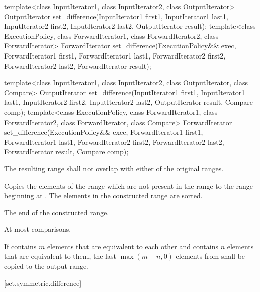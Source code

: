 %
\begin{itemdecl}
template<class InputIterator1, class InputIterator2,
         class OutputIterator>
  OutputIterator
    set_difference(InputIterator1 first1, InputIterator1 last1,
                   InputIterator2 first2, InputIterator2 last2,
                   OutputIterator result);
template<class ExecutionPolicy, class ForwardIterator1, class ForwardIterator2,
           class ForwardIterator>
  ForwardIterator
    set_difference(ExecutionPolicy&& exec,
                   ForwardIterator1 first1, ForwardIterator1 last1,
                   ForwardIterator2 first2, ForwardIterator2 last2,
                   ForwardIterator result);

template<class InputIterator1, class InputIterator2,
         class OutputIterator, class Compare>
  OutputIterator
    set_difference(InputIterator1 first1, InputIterator1 last1,
                   InputIterator2 first2, InputIterator2 last2,
                   OutputIterator result, Compare comp);
template<class ExecutionPolicy, class ForwardIterator1, class ForwardIterator2,
         class ForwardIterator, class Compare>
  ForwardIterator
    set_difference(ExecutionPolicy&& exec,
                   ForwardIterator1 first1, ForwardIterator1 last1,
                   ForwardIterator2 first2, ForwardIterator2 last2,
                   ForwardIterator result, Compare comp);
\end{itemdecl}

\begin{itemdescr}
\pnum
\requires
The resulting range shall not overlap with either of the original ranges.

\pnum
\effects
Copies the elements of the range
which are not present in the range
to the range beginning at
.
The elements in the constructed range are sorted.

\pnum
\returns
The end of the constructed range.

\pnum
\complexity
At most
comparisons.

\pnum
\remarks
If
contains $m$
elements that are equivalent to each other and
contains $n$
elements that are equivalent to them, the last
$\max(m - n, 0)$
elements from
shall be copied to the output range.
\end{itemdescr}

[set.symmetric.difference]{}

